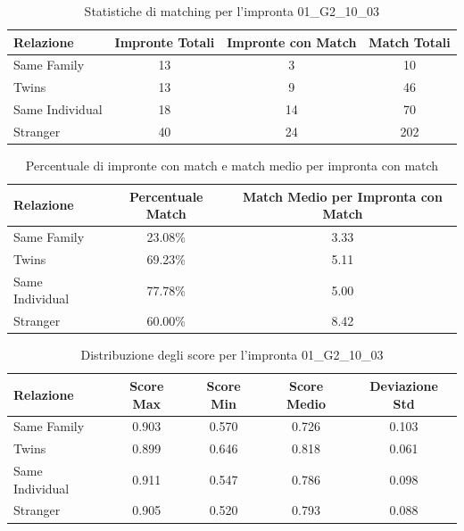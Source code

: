 \begin{table}[htbp]
\centering
\caption{Statistiche di matching per l'impronta 01\_G2\_10\_03}
\label{tab:results_01_G2_10_03}
\begin{tabular}{|l|c|c|c|}
\hline
\textbf{Relazione} & \textbf{Impronte Totali} & \textbf{Impronte con Match} & \textbf{Match Totali} \\
\hline
Same Family & 13 & 3 & 10 \\
\hline
Twins & 13 & 9 & 46 \\
\hline
Same Individual & 18 & 14 & 70 \\
\hline
Stranger & 40 & 24 & 202 \\
\hline
\end{tabular}
\end{table}


\begin{table}[htbp]
\centering
\caption{Percentuale di impronte con match e match medio per impronta con match}
\label{tab:match_percentage_01_G2_10_03}
\begin{tabular}{|l|c|c|}
\hline
\textbf{Relazione} & \textbf{Percentuale Match} & \textbf{Match Medio per Impronta con Match} \\
\hline
Same Family & 23.08\% & 3.33 \\
\hline
Twins & 69.23\% & 5.11 \\
\hline
Same Individual & 77.78\% & 5.00 \\
\hline
Stranger & 60.00\% & 8.42 \\
\hline
\end{tabular}
\end{table}


\begin{table}[htbp]
\centering
\caption{Distribuzione degli score per l'impronta 01\_G2\_10\_03}
\label{tab:scores_01_G2_10_03}
\begin{tabular}{|l|c|c|c|c|}
\hline
\textbf{Relazione} & \textbf{Score Max} & \textbf{Score Min} & \textbf{Score Medio} & \textbf{Deviazione Std} \\
\hline
Same Family & 0.903 & 0.570 & 0.726 & 0.103 \\
\hline
Twins & 0.899 & 0.646 & 0.818 & 0.061 \\
\hline
Same Individual & 0.911 & 0.547 & 0.786 & 0.098 \\
\hline
Stranger & 0.905 & 0.520 & 0.793 & 0.088 \\
\hline
\end{tabular}
\end{table}

